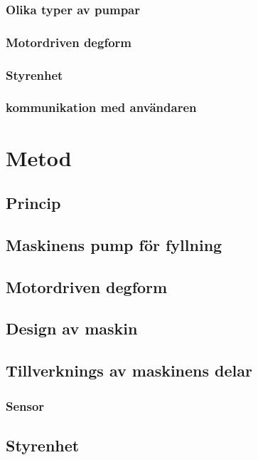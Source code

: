 \documentclass[11pt,a4paper,oneside]{book}
\begin{document}
\subsection{Olika typer av pumpar}
 
\newpage
\subsection{Motordriven degform}

\subsection{Styrenhet}

\subsection{kommunikation med användaren}


\chapter{Metod}
\section{Princip}

\section{Maskinens pump för fyllning}

\section{Motordriven degform}

\section{Design av maskin}

\section{Tillverknings av maskinens delar}

\subsection{Sensor}
\section{Styrenhet}

\end{document}

